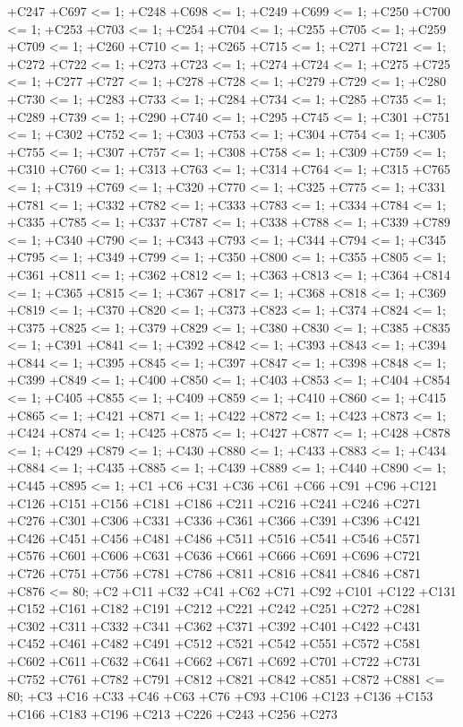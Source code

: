+C247 +C697 <= 1;
+C248 +C698 <= 1;
+C249 +C699 <= 1;
+C250 +C700 <= 1;
+C253 +C703 <= 1;
+C254 +C704 <= 1;
+C255 +C705 <= 1;
+C259 +C709 <= 1;
+C260 +C710 <= 1;
+C265 +C715 <= 1;
+C271 +C721 <= 1;
+C272 +C722 <= 1;
+C273 +C723 <= 1;
+C274 +C724 <= 1;
+C275 +C725 <= 1;
+C277 +C727 <= 1;
+C278 +C728 <= 1;
+C279 +C729 <= 1;
+C280 +C730 <= 1;
+C283 +C733 <= 1;
+C284 +C734 <= 1;
+C285 +C735 <= 1;
+C289 +C739 <= 1;
+C290 +C740 <= 1;
+C295 +C745 <= 1;
+C301 +C751 <= 1;
+C302 +C752 <= 1;
+C303 +C753 <= 1;
+C304 +C754 <= 1;
+C305 +C755 <= 1;
+C307 +C757 <= 1;
+C308 +C758 <= 1;
+C309 +C759 <= 1;
+C310 +C760 <= 1;
+C313 +C763 <= 1;
+C314 +C764 <= 1;
+C315 +C765 <= 1;
+C319 +C769 <= 1;
+C320 +C770 <= 1;
+C325 +C775 <= 1;
+C331 +C781 <= 1;
+C332 +C782 <= 1;
+C333 +C783 <= 1;
+C334 +C784 <= 1;
+C335 +C785 <= 1;
+C337 +C787 <= 1;
+C338 +C788 <= 1;
+C339 +C789 <= 1;
+C340 +C790 <= 1;
+C343 +C793 <= 1;
+C344 +C794 <= 1;
+C345 +C795 <= 1;
+C349 +C799 <= 1;
+C350 +C800 <= 1;
+C355 +C805 <= 1;
+C361 +C811 <= 1;
+C362 +C812 <= 1;
+C363 +C813 <= 1;
+C364 +C814 <= 1;
+C365 +C815 <= 1;
+C367 +C817 <= 1;
+C368 +C818 <= 1;
+C369 +C819 <= 1;
+C370 +C820 <= 1;
+C373 +C823 <= 1;
+C374 +C824 <= 1;
+C375 +C825 <= 1;
+C379 +C829 <= 1;
+C380 +C830 <= 1;
+C385 +C835 <= 1;
+C391 +C841 <= 1;
+C392 +C842 <= 1;
+C393 +C843 <= 1;
+C394 +C844 <= 1;
+C395 +C845 <= 1;
+C397 +C847 <= 1;
+C398 +C848 <= 1;
+C399 +C849 <= 1;
+C400 +C850 <= 1;
+C403 +C853 <= 1;
+C404 +C854 <= 1;
+C405 +C855 <= 1;
+C409 +C859 <= 1;
+C410 +C860 <= 1;
+C415 +C865 <= 1;
+C421 +C871 <= 1;
+C422 +C872 <= 1;
+C423 +C873 <= 1;
+C424 +C874 <= 1;
+C425 +C875 <= 1;
+C427 +C877 <= 1;
+C428 +C878 <= 1;
+C429 +C879 <= 1;
+C430 +C880 <= 1;
+C433 +C883 <= 1;
+C434 +C884 <= 1;
+C435 +C885 <= 1;
+C439 +C889 <= 1;
+C440 +C890 <= 1;
+C445 +C895 <= 1;
+C1 +C6 +C31 +C36 +C61 +C66 +C91 +C96 +C121 +C126 +C151 +C156 +C181 +C186 +C211 +C216 +C241 +C246 +C271
 +C276 +C301 +C306 +C331 +C336 +C361 +C366 +C391 +C396 +C421 +C426 +C451 +C456 +C481 +C486 +C511 +C516
 +C541 +C546 +C571 +C576 +C601 +C606 +C631 +C636 +C661 +C666 +C691 +C696 +C721 +C726 +C751 +C756 +C781
 +C786 +C811 +C816 +C841 +C846 +C871 +C876 <= 80;
+C2 +C11 +C32 +C41 +C62 +C71 +C92 +C101 +C122 +C131 +C152 +C161 +C182 +C191 +C212 +C221 +C242 +C251 +C272
 +C281 +C302 +C311 +C332 +C341 +C362 +C371 +C392 +C401 +C422 +C431 +C452 +C461 +C482 +C491 +C512 +C521
 +C542 +C551 +C572 +C581 +C602 +C611 +C632 +C641 +C662 +C671 +C692 +C701 +C722 +C731 +C752 +C761 +C782
 +C791 +C812 +C821 +C842 +C851 +C872 +C881 <= 80;
+C3 +C16 +C33 +C46 +C63 +C76 +C93 +C106 +C123 +C136 +C153 +C166 +C183 +C196 +C213 +C226 +C243 +C256 +C273
